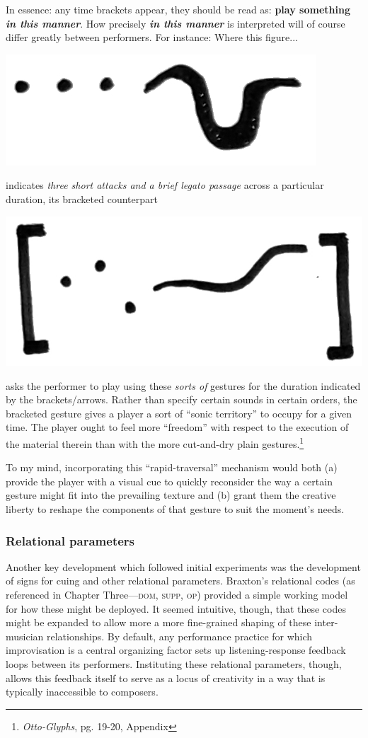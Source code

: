     \begin{smallquote}
            In essence: any time brackets appear, they should be read as: \textbf{play something \textit{in this manner}}. How precisely \textbf{\textit{in this manner}} is interpreted will of course differ greatly between performers. For instance: Where this figure...

            \begin{center}
            \includegraphics[width=.2\textwidth]{images/chapter4/01-3dotscurve.png}
            \end{center}
            
            \noindent indicates \textit{three short attacks and a brief legato passage} across a particular duration, its bracketed counterpart

            \begin{center}
            \includegraphics[width=.2\textwidth]{images/chapter4/01-3dotscurvebracket2.png}
            \end{center}
            
            \noindent asks the performer to play using these \textit{sorts of} gestures for the duration indicated by the brackets/arrows. Rather than specify certain sounds in certain orders, the bracketed gesture gives a player a sort of ``sonic territory'' to occupy for a given time. The player ought to feel more ``freedom'' with respect to the execution of the material therein than with the more cut-and-dry plain gestures.\footnote{\textit{Otto-Glyphs}, pg. 19-20, Appendix}
    \end{smallquote}

    To my mind, incorporating this ``rapid-traversal'' mechanism would both (a) provide the player with a visual cue to quickly reconsider the way a certain gesture might fit into the prevailing texture and (b) grant them the creative liberty to reshape the components of that gesture to suit the moment's needs.

    \subsubsection{Relational parameters}
    Another key development which followed initial experiments was the development of signs for cuing and other relational parameters. Braxton's relational codes (as referenced in Chapter Three---\textsc{dom}, \textsc{supp}, \textsc{op}) provided a simple working model for how these might be deployed. It seemed intuitive, though, that these codes might be expanded to allow more a more fine-grained shaping of these inter-musician relationships. By default, any performance practice for which improvisation is a central organizing factor sets up listening-response feedback loops between its performers. Instituting these relational parameters, though, allows this feedback itself to serve as a locus of creativity in a way that is typically inaccessible to composers.

